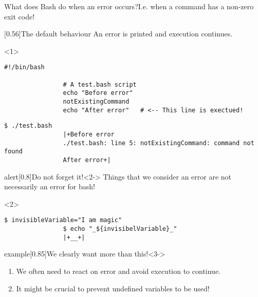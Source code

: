 \begin{frame}[fragile]{What does Bash do when an error occurs?}{I.e. when a command has a non-zero exit code!}
    \vspace{-3mm}
    \begin{overlayarea}{\textwidth}{0.7\textheight}
        \begin{varblock}{}[0.56\textwidth]{The default behaviour}
            An error is printed and \alert{execution continues}.
        \end{varblock}
        \begin{onlyenv}<1>
            \begin{lstlisting}[style=myBash, numbers=none, aboveskip=5mm]
                #!/bin/bash

                # A test.bash script
                echo "Before error"
                notExistingCommand
                echo "After error"   # <-- This line is exectued!
            \end{lstlisting}
            \begin{lstlisting}[style=myBash, numbers=none, aboveskip=2mm]
                $ ./test.bash
                |+Before error
                ./test.bash: line 5: notExistingCommand: command not found
                After error+|
            \end{lstlisting}
        \end{onlyenv}
        \begin{varblock}{alert}[0.8\textwidth]{Do not forget it!}<2->
            Things that we consider an error are not necessarily an error for bash!
        \end{varblock}
        \begin{onlyenv}<2>
            \begin{lstlisting}[style=myBash, numbers=none, aboveskip=5mm]
                $ invisibleVariable="I am magic"
                $ echo "_${invisibelVariable}_"
                |+__+|
            \end{lstlisting}
        \end{onlyenv}
        \begin{varblock}{example}[0.85\textwidth]{We clearly want more than this!}<3->
            \begin{enumerate}
                \item We often need to react on error and avoid execution to continue.
                \item It might be crucial to prevent undefined variables to be used!
            \end{enumerate}

\end{varblock}
\end{overlayarea}
\end{frame}
